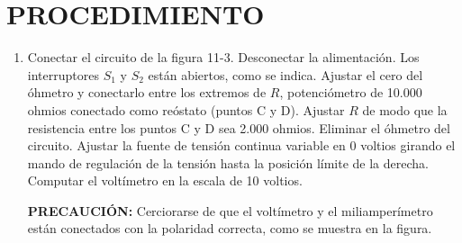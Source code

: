 \documentclass[12pt]{article}
\begin{document}
\section{PROCEDIMIENTO}
\begin{enumerate}
    \item Conectar el circuito de la figura 11-3. Desconectar la alimentación. Los interruptores \( S_1 \) y \( S_2 \) están abiertos, como se indica. Ajustar el cero del óhmetro y conectarlo entre los extremos de \( R \), potenciómetro de 10.000 ohmios conectado como reóstato (puntos C y D). Ajustar \( R \) de modo que la resistencia entre los puntos C y D sea 2.000 ohmios. Eliminar el óhmetro del circuito. Ajustar la fuente de tensión continua variable en 0 voltios girando el mando de regulación de la tensión hasta la posición límite de la derecha. Computar el voltímetro en la escala de 10 voltios.
    
    \textbf{PRECAUCIÓN:} Cerciorarse de que el voltímetro y el miliamperímetro están conectados con la polaridad correcta, como se muestra en la figura.
\end{enumerate}

\newpage
\end{document}
